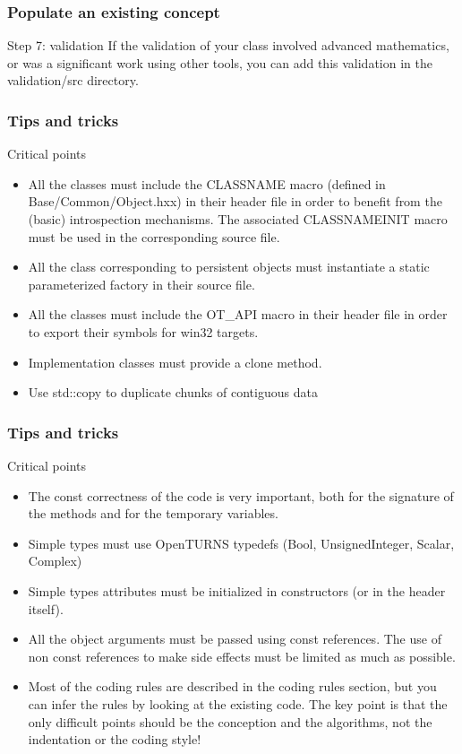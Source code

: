 \documentclass[8pt]{beamer}
\begin{document}
\begin{frame}
  \frametitle{Populate an existing concept}
  \begin{block}{Step 7: validation}
    If the validation of your class involved advanced mathematics, or was a significant work using other tools, you can add this validation in the validation/src directory.

  \end{block}
\end{frame}
\begin{frame}
  \frametitle{Tips and tricks}
  \begin{block}{Critical points}
    \begin{itemize}
    \item All the classes must include the {\ttfamily CLASSNAME} macro (defined in Base/Common/Object.hxx) in their header file in order to benefit from the (basic) introspection mechanisms. The associated {\ttfamily CLASSNAMEINIT} macro must be used in the corresponding source file.
    \item All the class corresponding to persistent objects must instantiate a static parameterized factory in their source file.
        \item All the classes must include the {\ttfamily OT\_API} macro in their header file in order to export their symbols for win32 targets.
    \item Implementation classes must provide a clone method.
      \item Use std::copy to duplicate chunks of contiguous data
    \end{itemize}
  \end{block}
\end{frame}

\begin{frame}
  \frametitle{Tips and tricks}
  \begin{block}{Critical points}
    \begin{itemize}
      \item The const correctness of the code is very important, both for the signature of the methods and for the temporary variables.
      \item Simple types must use OpenTURNS typedefs (Bool, UnsignedInteger, Scalar, Complex)
      \item Simple types attributes must be initialized in constructors (or in the header itself).
      \item All the object arguments must be passed using const references. The use of non const references to make side effects must be limited as much as possible.
      \item Most of the coding rules are described in the coding rules section, but you can infer the rules by looking at the existing code. \alert{The key point is that the only difficult points should be the conception and the algorithms, not the indentation or the coding style!}
    \end{itemize}
  \end{block}
\end{frame}
\end{document}
